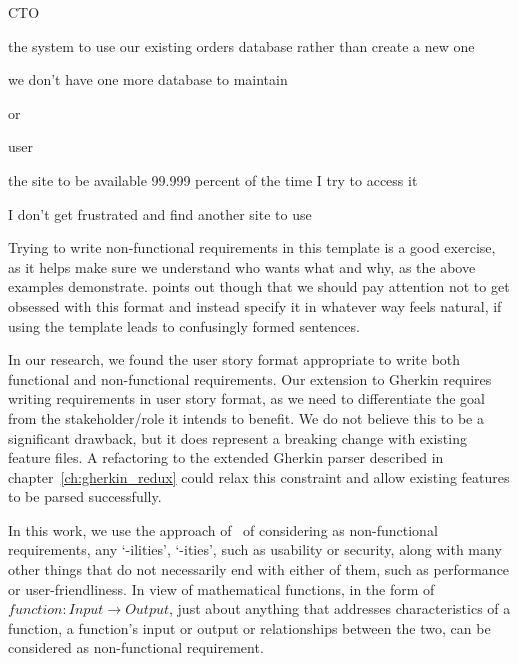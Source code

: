 \documentclass[dissertation,final]{softeng}
\newcommand{\nfrs}{non-functional requirements\xspace}
\begin{document}
\begin{center}
\begin{description}[itemsep=-5pt]
\item[As a] CTO 
\item[I want] the system to use our existing orders database rather than create a new one
\item[So that] we don't have one more database to maintain
\end{description}
\end{center}

or

\begin{center}
\begin{description}[itemsep=-5pt]
\item[As a] user
\item[I want] the site to be available 99.999 percent of the time I try to access it
\item[So that] I don't get frustrated and find another site to use
\end{description}
\end{center}

Trying to write \nfrs in this template is a good exercise, as it helps make sure we understand who wants what and why, as the above examples demonstrate. \citet{CohnNFRS} points out though that we should pay attention not to get obsessed with this format and instead specify it in whatever way feels natural, if using the template leads to confusingly formed sentences.

In our research, we found the user story format appropriate to write both functional and non-functional requirements. Our extension to Gherkin requires writing requirements in user story format, as we need to differentiate the goal from the stakeholder/role it intends to benefit. We do not believe this to be a significant drawback, but it does represent a breaking change with existing feature files. A refactoring to the extended Gherkin parser described in chapter~\ref{ch:gherkin_redux} could relax this constraint and allow existing features to be parsed successfully.

In this work, we use the approach of~\citet{Chung:2009vg} of considering as non-functional requirements, any `-ilities', `-ities', such as usability or security, along with many other things that do not necessarily end with either of them, such as performance or user-friendliness. In view of mathematical functions, in the form of $\mathit{function} : \mathit{Input} \rightarrow \mathit{Output}$, just about anything that addresses characteristics of a function, a function's input or output or relationships between the two, can be considered as non-functional requirement.
\end{document}
